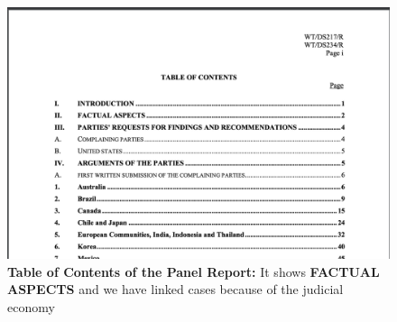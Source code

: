 \begin{figure}
    \centering
    \includegraphics[scale=0.2]{Data/pngs/panel_report_toc.png}
    \caption{{\bf Table of Contents of the Panel Report: }It shows {\bf FACTUAL ASPECTS} and we have linked cases because of the judicial economy }
\end{figure}
